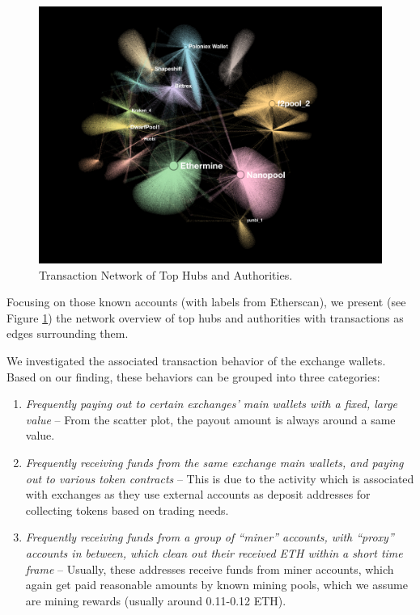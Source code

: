 \begin{figure}[t]
\centering
\includegraphics[width=1.0\textwidth]{images/7_implemenation_and_usecases/pagerank.jpeg}
\caption{Transaction Network of Top Hubs and Authorities.}
\label{fig:page-rank}
\end{figure}

Focusing on those known accounts (with labels from Etherscan), we present (see Figure \ref{fig:page-rank}) the network overview of top hubs and authorities with transactions as edges surrounding them.

We investigated the associated transaction behavior of the exchange wallets.
Based on our finding, these behaviors can be grouped into three categories:
\begin{enumerate}
    \item \textit{Frequently paying out to certain exchanges' main wallets with a fixed, large value} -- From the scatter plot, the payout amount is always around a same value.
    \item \textit{Frequently receiving funds from the same exchange main wallets, and paying out to various token contracts} -- This is due to the activity which is associated with exchanges as they use external accounts as deposit addresses for collecting tokens based on trading needs.

    \item \textit{Frequently receiving funds from a group of ``miner'' accounts, with ``proxy'' accounts in between, which clean out their received ETH within a short time frame} -- Usually, these addresses receive funds from miner accounts, which again get paid reasonable amounts by known mining pools, which we assume are mining rewards (usually around 0.11-0.12 ETH).
\end{enumerate}

